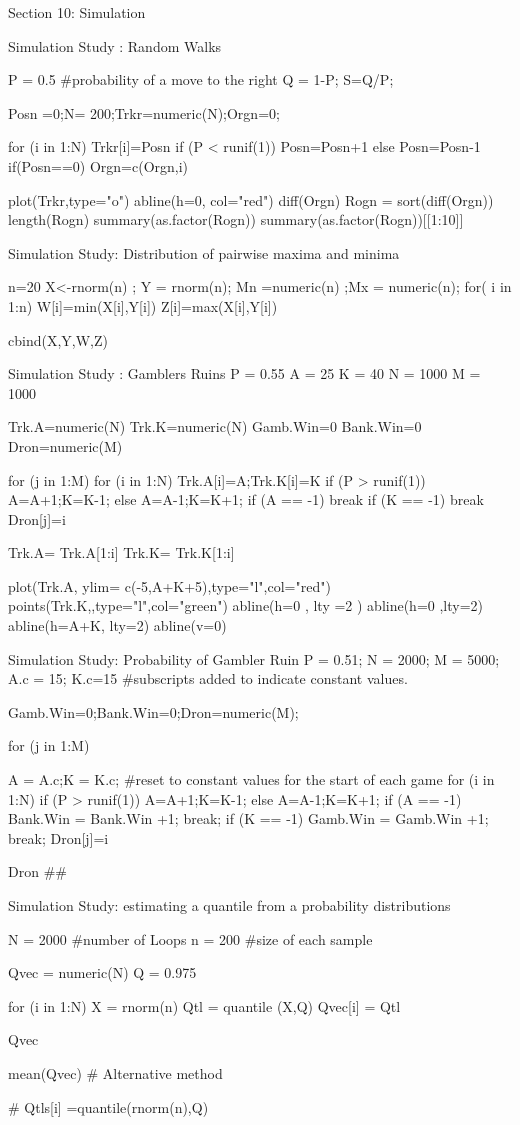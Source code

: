 

Section 10: Simulation

Simulation Study : Random Walks



P = 0.5 					#probability of a move to the right
Q = 1-P; S=Q/P;

Posn =0;N= 200;Trkr=numeric(N);Orgn=0; 

for (i in 1:N)
	{
	Trkr[i]=Posn
	if (P < runif(1)) Posn=Posn+1 else Posn=Posn-1
	if(Posn==0) Orgn=c(Orgn,i)
	}


plot(Trkr,type="o")
abline(h=0, col="red")
diff(Orgn)
Rogn = sort(diff(Orgn))
length(Rogn)
summary(as.factor(Rogn))
summary(as.factor(Rogn))[[1:10]]

Simulation Study: Distribution of pairwise maxima and minima



n=20
X<-rnorm(n) ; Y = rnorm(n); 
Mn =numeric(n) ;Mx = numeric(n);
for( i in 1:n)
{
W[i]=min(X[i],Y[i])
Z[i]=max(X[i],Y[i])
}

cbind(X,Y,W,Z)




Simulation Study : Gamblers Ruins
P = 0.55
A = 25
K = 40
N = 1000
M = 1000

Trk.A=numeric(N)
Trk.K=numeric(N)
Gamb.Win=0
Bank.Win=0
Dron=numeric(M)

for (j in 1:M){
for (i in 1:N)
{
Trk.A[i]=A;Trk.K[i]=K
if (P > runif(1)) {A=A+1;K=K-1;} else {A=A-1;K=K+1;}
if (A == -1) {break}
if (K == -1) {break}
Dron[j]=i
}
}


Trk.A= Trk.A[1:i]
Trk.K= Trk.K[1:i]

plot(Trk.A, ylim= c(-5,A+K+5),type="l",col="red")
points(Trk.K,,type="l",col="green")
abline(h=0 , lty =2 )
abline(h=0 ,lty=2)
abline(h=A+K, lty=2)
abline(v=0)



Simulation Study: Probability of Gambler Ruin
P = 0.51;  N = 2000; M = 5000; A.c = 15; K.c=15	#subscripts added to indicate constant values.

Gamb.Win=0;Bank.Win=0;Dron=numeric(M);

for (j in 1:M){
	A = A.c;K = K.c;			#reset to constant values for the start of each game
	for (i in 1:N)
	{
	if (P > runif(1)) {A=A+1;K=K-1;} else {A=A-1;K=K+1;}
	if (A == -1) {Bank.Win = Bank.Win +1; break; }
	if (K == -1) {Gamb.Win = Gamb.Win +1; break;}
	Dron[j]=i
	}

}
Dron
##



Simulation Study: estimating a quantile from a probability distributions



N = 2000 #number of Loops
n = 200 #size of each sample

Qvec = numeric(N)
Q = 0.975

for (i in 1:N){
X = rnorm(n)
Qtl = quantile (X,Q)
Qvec[i] = Qtl
}

Qvec

mean(Qvec)
# Alternative method

# Qtls[i] =quantile(rnorm(n),Q)

